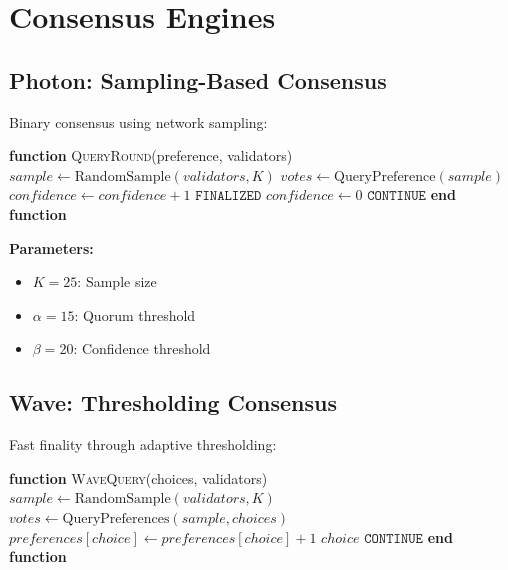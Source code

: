 \section{Consensus Engines}


\subsection{Photon: Sampling-Based Consensus}

Binary consensus using network sampling:



\begin{algorithmic}[1]
\State \textbf{function} \textsc{QueryRound}(preference, validators)
    \State $sample \gets \text{RandomSample}(validators, K)$
    \State $votes \gets \text{QueryPreference}(sample)$
        \State $confidence \gets confidence + 1$
            \State \Return $\texttt{FINALIZED}$
        \EndIf
    \Else
        \State $confidence \gets 0$
    \EndIf
    \State \Return $\texttt{CONTINUE}$
\State \textbf{end function}
\end{algorithmic}


\textbf{Parameters:}
\begin{itemize}
\item $K = 25$: Sample size
\item $\alpha = 15$: Quorum threshold
\item $\beta = 20$: Confidence threshold
\end{itemize}

\subsection{Wave: Thresholding Consensus}

Fast finality through adaptive thresholding:



\begin{algorithmic}[1]
\State \textbf{function} \textsc{WaveQuery}(choices, validators)
    \State $sample \gets \text{RandomSample}(validators, K)$
    \State $votes \gets \text{QueryPreferences}(sample, choices)$
            \State $preferences[choice] \gets preferences[choice] + 1$
                \State \Return $choice$ 
            \EndIf
        \EndIf
    \EndFor
    \State \Return $\texttt{CONTINUE}$
\State \textbf{end function}
\end{algorithmic}


